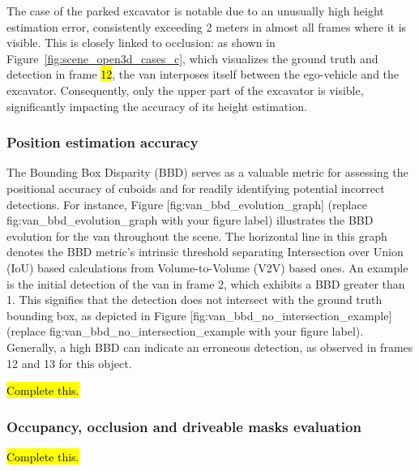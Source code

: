 The case of the parked excavator is notable due to an unusually high height estimation error, consistently exceeding 2 meters in almost all frames where it is visible. This is closely linked to occlusion: as shown in Figure~\ref{fig:scene_open3d_cases_c}, which visualizes the ground truth and detection in frame \hl{12}, the van interposes itself between the ego-vehicle and the excavator. Consequently, only the upper part of the excavator is visible, significantly impacting the accuracy of its height estimation.

\subsubsection{Position estimation accuracy}
The Bounding Box Disparity (BBD) serves as a valuable metric for assessing the positional accuracy of cuboids and for readily identifying potential incorrect detections. For instance, Figure [fig:van\_bbd\_evolution\_graph] (replace fig:van\_bbd\_evolution\_graph with your figure label) illustrates the BBD evolution for the van throughout the scene. The horizontal line in this graph denotes the BBD metric's intrinsic threshold separating Intersection over Union (IoU) based calculations from Volume-to-Volume (V2V) based ones. An example is the initial detection of the van in frame 2, which exhibits a BBD greater than 1. This signifies that the detection does not intersect with the ground truth bounding box, as depicted in Figure [fig:van\_bbd\_no\_intersection\_example] (replace fig:van\_bbd\_no\_intersection\_example with your figure label). Generally, a high BBD can indicate an erroneous detection, as observed in frames 12 and 13 for this object.

\hl{Complete this.}


\subsubsection{Occupancy, occlusion and driveable masks evaluation}
\hl{Complete this.}


